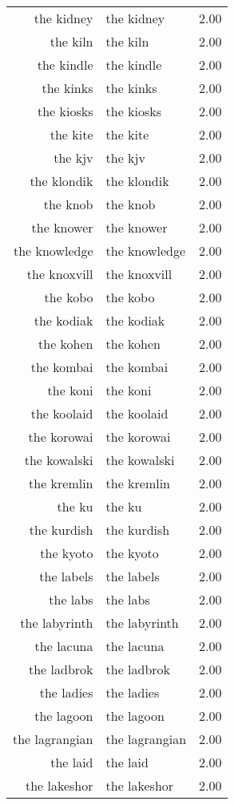 \begin{table}[ht]
\begin{tabular}{rlr}
  the kidney & the kidney & 2.00 \\ 
  the kiln & the kiln & 2.00 \\ 
  the kindle & the kindle & 2.00 \\ 
  the kinks & the kinks & 2.00 \\ 
  the kiosks & the kiosks & 2.00 \\ 
  the kite & the kite & 2.00 \\ 
  the kjv & the kjv & 2.00 \\ 
  the klondik & the klondik & 2.00 \\ 
  the knob & the knob & 2.00 \\ 
  the knower & the knower & 2.00 \\ 
  the knowledge & the knowledge & 2.00 \\ 
  the knoxvill & the knoxvill & 2.00 \\ 
  the kobo & the kobo & 2.00 \\ 
  the kodiak & the kodiak & 2.00 \\ 
  the kohen & the kohen & 2.00 \\ 
  the kombai & the kombai & 2.00 \\ 
  the koni & the koni & 2.00 \\ 
  the koolaid & the koolaid & 2.00 \\ 
  the korowai & the korowai & 2.00 \\ 
  the kowalski & the kowalski & 2.00 \\ 
  the kremlin & the kremlin & 2.00 \\ 
  the ku & the ku & 2.00 \\ 
  the kurdish & the kurdish & 2.00 \\ 
  the kyoto & the kyoto & 2.00 \\ 
  the labels & the labels & 2.00 \\ 
  the labs & the labs & 2.00 \\ 
  the labyrinth & the labyrinth & 2.00 \\ 
  the lacuna & the lacuna & 2.00 \\ 
  the ladbrok & the ladbrok & 2.00 \\ 
  the ladies & the ladies & 2.00 \\ 
  the lagoon & the lagoon & 2.00 \\ 
  the lagrangian & the lagrangian & 2.00 \\ 
  the laid & the laid & 2.00 \\ 
  the lakeshor & the lakeshor & 2.00 \\ 

\end{tabular}
\end{table}

